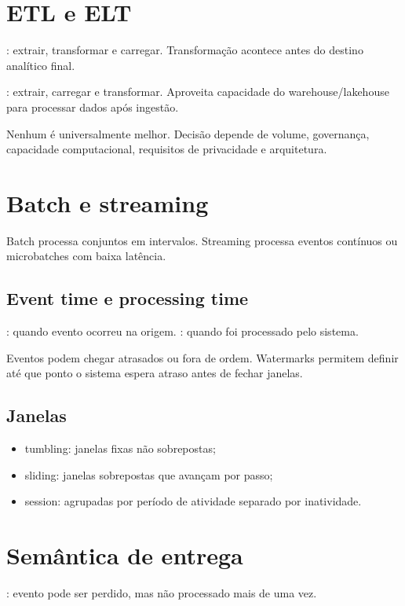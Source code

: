 \section{ETL e ELT}

: extrair, transformar e carregar. Transformação acontece antes do destino analítico final.

: extrair, carregar e transformar. Aproveita capacidade do warehouse/lakehouse para processar dados após ingestão.

Nenhum é universalmente melhor. Decisão depende de volume, governança, capacidade computacional, requisitos de privacidade e arquitetura.

\section{Batch e streaming}

Batch processa conjuntos em intervalos. Streaming processa eventos contínuos ou microbatches com baixa latência.

\subsection{Event time e processing time}

: quando evento ocorreu na origem. : quando foi processado pelo sistema.

Eventos podem chegar atrasados ou fora de ordem. Watermarks permitem definir até que ponto o sistema espera atraso antes de fechar janelas.

\subsection{Janelas}

\begin{itemize}
\item tumbling: janelas fixas não sobrepostas;
\item sliding: janelas sobrepostas que avançam por passo;
\item session: agrupadas por período de atividade separado por inatividade.
\end{itemize}

\section{Semântica de entrega}

: evento pode ser perdido, mas não processado mais de uma vez.

